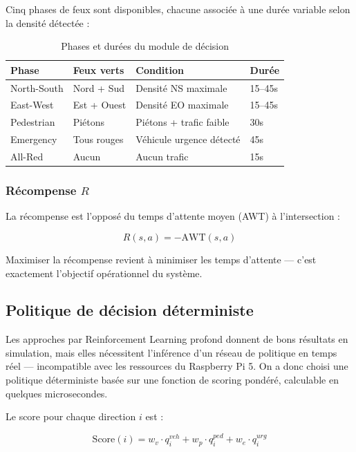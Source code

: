 Cinq phases de feux sont disponibles,
chacune associée à une durée variable
selon la densité détectée :

\begin{table}[H]
\centering
\caption{Phases et durées du module de
         décision}
\begin{tabularx}{\textwidth}{llXl}
\toprule
\textbf{Phase} &
\textbf{Feux verts} &
\textbf{Condition} &
\textbf{Durée} \\
\midrule
North-South & Nord + Sud &
Densité NS maximale & 15--45s \\
East-West   & Est + Ouest &
Densité EO maximale & 15--45s \\
Pedestrian  & Piétons &
Piétons + trafic faible & 30s \\
Emergency   & Tous rouges &
Véhicule urgence détecté & 45s \\
All-Red     & Aucun &
Aucun trafic & 15s \\
\bottomrule
\end{tabularx}
\label{tab:phases}
\end{table}

\subsubsection{Récompense $R$}

La récompense est l'opposé du temps
d'attente moyen (AWT) à l'intersection :

\begin{equation}
R(s, a) = -\text{AWT}(s, a)
\label{eq:reward}
\end{equation}

Maximiser la récompense revient à minimiser
les temps d'attente — c'est exactement
l'objectif opérationnel du système.

\subsection{Politique de décision déterministe}

Les approches par Reinforcement Learning
profond donnent de bons résultats en
simulation, mais elles nécessitent l'inférence
d'un réseau de politique en temps réel —
incompatible avec les ressources du
Raspberry Pi 5. On a donc choisi une politique
déterministe basée sur une fonction de
scoring pondéré, calculable en quelques
microsecondes.

Le score pour chaque direction $i$ est :

\begin{equation}
\text{Score}(i) = w_v \cdot q_i^{veh}
               + w_p \cdot q_i^{ped}
               + w_e \cdot q_i^{urg}
\label{eq:score}
\end{equation}

